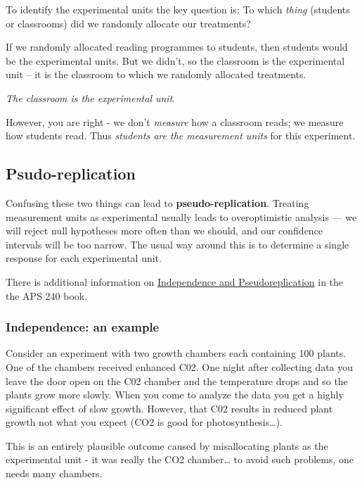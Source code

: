 \documentclass[
]{book}
\begin{document}
To identify the experimental units the key question is: To which \emph{thing} (students or classrooms) did we randomly allocate our treatments?

If we randomly allocated reading programmes to students, then students would be the experimental units. But we didn't, so the classroom is the experimental unit -- it is the classroom to which we randomly allocated treatments.

\emph{The classroom is the experimental unit}.

However, you are right - we don't \emph{measure} how a classroom reads; we measure how students read. Thus \emph{students are the measurement units} for this experiment.

\hypertarget{psudo-replication}{%
\subsection{Psudo-replication}\label{psudo-replication}}

Confusing these two things can lead to \textbf{pseudo-replication}. Treating measurement units as experimental usually leads to overoptimistic analysis --- we will reject null hypotheses more often than we should, and our confidence intervals will be too narrow. The usual way around this is to determine a single response for each experimental unit.

There is additional information on \href{https://dzchilds.github.io/stats-for-bio/principles-experimental-design.html\#independence}{Independence and Pseudoreplication} in the the APS 240 book.

\hypertarget{independence-an-example}{%
\subsubsection{Independence: an example}\label{independence-an-example}}

Consider an experiment with two growth chambers each containing 100 plants. One of the chambers received enhanced C02. One night after collecting data you leave the door open on the C02 chamber and the temperature drops and so the plants grow more slowly. When you come to analyze the data you get a highly significant effect of slow growth. However, that C02 results in reduced plant growth not what you expect (CO2 is good for photosynthesis\ldots).

This is an entirely plausible outcome caused by misallocating plants as the experimental unit - it was really the CO2 chamber\ldots{} to avoid such problems, one needs many chambers.
\end{document}
